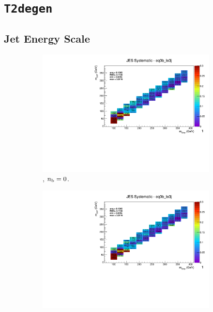\newpage
\section*{\texttt{T2degen}}
\label{sec:t2degen_syst_plots}

\newpage
\subsection*{Jet Energy Scale}
\label{sec:t2degen_jes_plots}

\begin{figure}[ht!]
  \centering
  \begin{subfigure}[b]{0.32\textwidth}
    \includegraphics[width=\textwidth, page=12]{Figs/sms/t2degen/v19/systs/T2_4body_JES_eq0b_le3j.pdf}
    \caption{\njlow, $n_{\text{b}} = 0$.}
  \end{subfigure}
  \begin{subfigure}[b]{0.32\textwidth}
    \includegraphics[width=\textwidth, page=8]{Figs/sms/t2degen/v19/systs/T2_4body_JES_eq0b_le3j.pdf}

\end{subfigure}
\end{figure}
